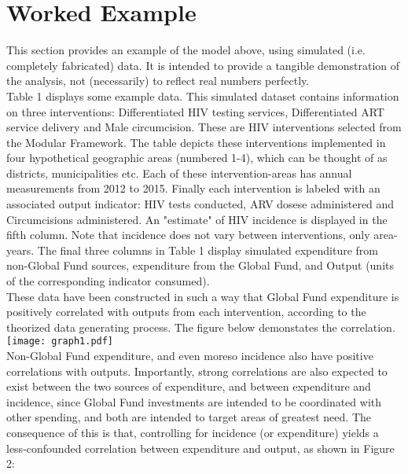 \documentclass[twocolumn]{bmcart}%
\begin{document}
\section{Worked Example}
This section provides an example of the model above, using simulated (i.e. completely fabricated) data. It is intended to provide a tangible demonstration of the analysis, not (necessarily) to reflect real numbers perfectly. \\

Table 1 displays some example data. This simulated dataset contains information on three interventions: Differentiated HIV testing services, Differentiated ART service delivery and Male circumcision. These are HIV interventions selected from the Modular Framework. The table depicts these interventions implemented in four hypothetical geographic areas (numbered 1-4), which can be thought of as districts, municipalities etc. Each of these intervention-areas has annual measurements from 2012 to 2015. Finally each intervention is labeled with  an associated output indicator: HIV tests conducted, ARV dosese administered and Circumcisions administered. An "estimate" of HIV incidence is displayed in the fifth column. Note that incidence does not vary between interventions, only area-years. The final three columns in Table 1 display simulated expenditure from non-Global Fund sources, expenditure from the Global Fund, and Output (units of the corresponding indicator consumed). \\

These data have been constructed in such a way that Global Fund expenditure is positively correlated with outputs from each intervention, according to the theorized data generating process. The figure below demonstates the correlation. \\

\hspace*{-.3in}
\texttt{[image: graph1.pdf]} \\

Non-Global Fund expenditure, and even moreso incidence also have positive correlations with outputs. Importantly, strong correlations are also expected to exist between the two sources of expenditure, and between expenditure and incidence, since Global Fund investments are intended to be coordinated with other spending, and both are intended to target areas of greatest need. The consequence of this is that, controlling for incidence (or expenditure) yields a less-confounded correlation between expenditure and output, as shown in Figure 2:
\end{document}
